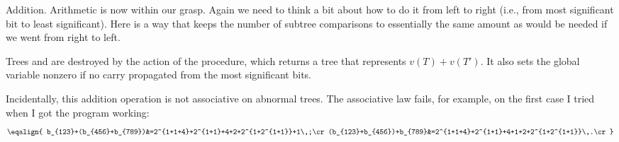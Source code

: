 Addition. Arithmetic is now within our grasp. Again
we need to think a bit about how to do it from left to right (i.e., from
most significant bit to least significant). Here is a way that keeps the
number of subtree comparisons to essentially the same amount as would
be needed if we went from right to left.

Trees  and  are destroyed by the action of the 
procedure,
which returns a tree that represents $v(T)+v(T')$. It also sets the
global variable  nonzero if no carry propagated from the most
significant bits.

Incidentally, this addition operation is not associative on abnormal
trees. The associative law fails, for example, on the first case I
tried when I got the program working:
$$\eqalign{
b_{123}+(b_{456}+b_{789})&=2^{1+1+4}+2^{1+1}+4+2+2^{1+2^{1+1}}+1\,;\cr
(b_{123}+b_{456})+b_{789}&=2^{1+1+4}+2^{1+1}+4+1+2+2^{1+2^{1+1}}\,.\cr}$$

